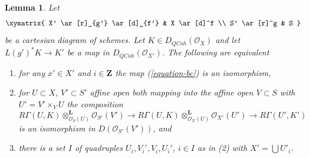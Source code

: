 \documentclass{stacks-project}
\theoremstyle{plain}
\newtheorem{lemma}[subsection]{Lemma}
\theoremstyle{definition}
\theoremstyle{remark}
\numberwithin{equation}{subsection}
\def\QCoh{\mathit{QCoh}}
\begin{document}
\begin{lemma}
\label{lemma-single-complex-base-change-condition}
Let
$$
\xymatrix{
X' \ar[r]_{g'} \ar[d]_{f'} &
X \ar[d]^f \\
S' \ar[r]^g &
S
}
$$
be a cartesian diagram of schemes. Let $K \in D_\QCoh(\mathcal{O}_X)$
and let $L(g')^*K \to K'$ be a map in $D_\QCoh(\mathcal{O}_{X'})$.
The following are equivalent
\begin{enumerate}
\item for any $x' \in X'$ and $i \in \mathbf{Z}$ the map (\ref{equation-bc})
is an isomorphism,
\item for $U \subset X$, $V' \subset S'$ affine open both mapping
into the affine open $V \subset S$ with $U' = V' \times_V U$
the composition
$$
R\Gamma(U, K) \otimes_{\mathcal{O}_S(U)}^\mathbf{L} \mathcal{O}_{S'}(V')
\to
R\Gamma(U, K) \otimes_{\mathcal{O}_X(U)}^\mathbf{L} \mathcal{O}_{X'}(U')
\to
R\Gamma(U', K')
$$
is an isomorphism in $D(\mathcal{O}_{S'}(V'))$, and
\item there is a set $I$ of quadruples $U_i, V_i', V_i, U_i'$, $i \in I$
as in (2) with $X' = \bigcup U'_i$.
\end{enumerate}
\end{lemma}
\end{document}
